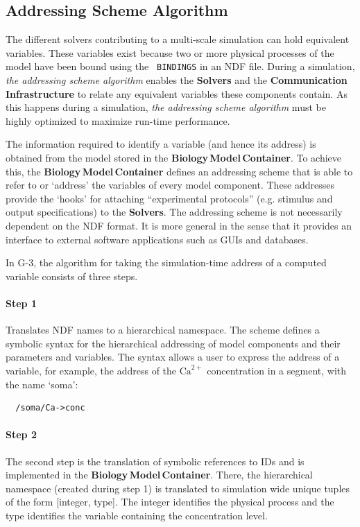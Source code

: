 \documentclass{article}
\begin{document}
\subsection{Addressing Scheme Algorithm}

The different solvers contributing to a multi-scale simulation can
hold equivalent variables.  These variables exist because two or more
physical processes of the model have been bound using the {\tt
  BINDINGS} in an NDF file.  During a simulation, {\it the addressing
  scheme algorithm} enables the {\bf Solvers} and the {\bf
  Communication\,Infrastructure} to relate any equivalent variables
these components contain.  As this happens during a simulation, {\it
  the addressing scheme algorithm} must be highly optimized to
maximize run-time performance.

The information required to identify a variable (and hence its
address) is obtained from the model stored in the {\bf
  Biology\,Model\,Container}. To achieve this, the {\bf
  Biology\,Model\,Container} defines an addressing scheme that is able
to refer to or `address' the variables of every model component.
These addresses provide the `hooks' for attaching ``experimental
protocols'' (e.g. stimulus and output specifications) to the {\bf
  Solvers}.  The addressing scheme is not necessarily dependent on the
NDF format. It is more general in the sense that it provides an
interface to external software applications such as GUIs and
databases.

In G-3, the algorithm for taking the simulation-time address of a
computed variable consists of three steps.

\paragraph{Step 1} Translates NDF names to a hierarchical namespace.
The scheme defines a symbolic syntax for the hierarchical addressing
of model components and their parameters and variables.  The syntax
allows a user to express the address of a variable, for example, the
address of the $\mathrm{Ca}^{2+}$ concentration in a segment, with the
name `soma':
\begin{verbatim}
  /soma/Ca->conc
\end{verbatim}

\paragraph{Step 2} The second step is the translation of symbolic
references to IDs and is implemented in the {\bf
  Biology\,Model\,Container}. There, the hierarchical namespace
(created during step 1) is translated to simulation wide unique tuples
of the form [integer, type].  The integer identifies the physical
process and the type identifies the variable containing the
concentration level.
\end{document}
